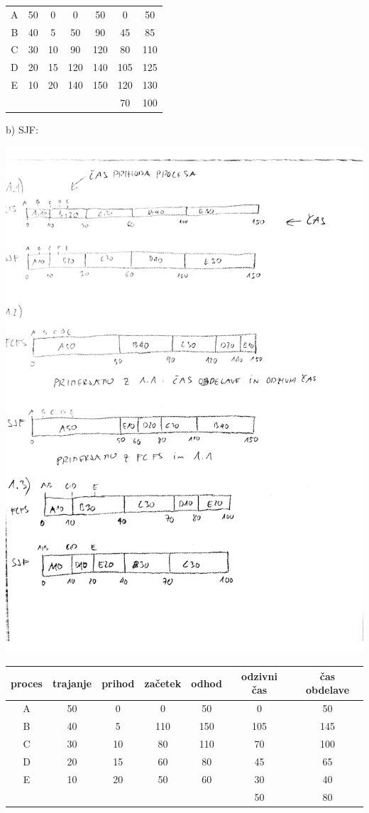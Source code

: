 {\begin{center}
\begin{tabular}{c|cc|cc|cc}
\hline
A & 50 &  0 &   0 & 50 & 0 & 50 \\
B & 40 &  5 & 50 & 90 & 45 & 85 \\
C & 30 & 10 & 90 & 120 & 80 & 110 \\
D & 20 & 15 & 120 & 140 & 105 & 125 \\
E & 10 & 20 & 140 & 150 & 120 & 130 \\
\hline
& & & & & 70 & 100
\end{tabular}
\end{center}
b) SJF:
\begin{center}
\includegraphics[width=.9\textwidth]{razvrscanje/1.2-SJF.pdf}\\
\begin{tabular}{c|cc|cc|cc}
proces & trajanje & prihod & začetek & odhod & odzivni čas & čas obdelave \\
\hline
A & 50 &  0 &   0 & 50 & 0 & 50 \\
B & 40 &  5 & 110 & 150 & 105 & 145 \\
C & 30 & 10 & 80 & 110 & 70 & 100 \\
D & 20 & 15 & 60 & 80 & 45 & 65 \\
E & 10 & 20 & 50 & 60 & 30 & 40 \\
\hline
& & & & & 50 & 80
\end{tabular}
\end{center}
}


